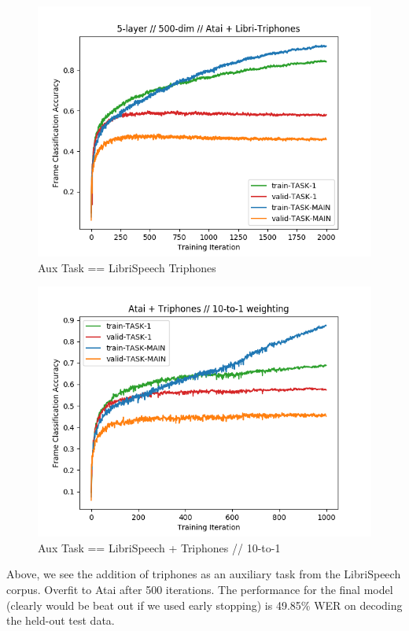 \documentclass[a4paper]{article}
\begin{document}
\begin{figure}[!htb]
  \centering
{}
  \includegraphics[width=\linewidth]{figs/atai-libritriphones.png}
  \caption{Aux Task == LibriSpeech Triphones}
\endminipage\hfill
\end{figure}


\begin{figure}[!htb]
  \centering
{}
  \includegraphics[width=\linewidth]{figs/atai-libritriphones-10-to-1.png}
  \caption{Aux Task == LibriSpeech + Triphones // 10-to-1}
\endminipage\hfill
\end{figure}



Above, we see the addition of triphones as an auxiliary task from the LibriSpeech corpus. Overfit to Atai after 500 iterations. The performance for the final model (clearly would be beat out if we used early stopping) is 49.85\% WER on decoding the held-out test data.
\end{document}
